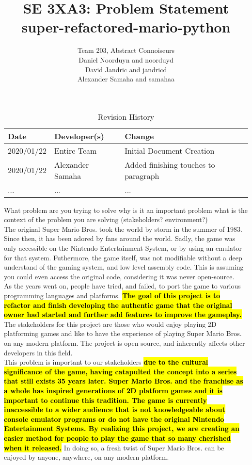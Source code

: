 \documentclass{article}
\title{SE 3XA3: Problem Statement\\super-refactored-mario-python}
\author{Team 203, Abstract Connoiseurs
		\\ Daniel Noorduyn and noorduyd
		\\ David Jandric and jandricd
		\\ Alexander Samaha and samahaa
}
\date{}
\begin{document}
\begin{table}[hp]
\caption{Revision History} \label{TblRevisionHistory}
\begin{tabularx}{\textwidth}{llX}
\toprule
\textbf{Date} & \textbf{Developer(s)} & \textbf{Change}\\
\midrule
2020/01/22 & Entire Team & Initial Document Creation\\
2020/01/22 & Alexander Samaha & Added finishing touches to paragraph\\
... & ... & ...\\
\bottomrule
\end{tabularx}
\end{table}

\newpage

\maketitle

What problem are you trying to solve
why is it an important problem
what is the context of the problem you are solving (stakeholders? environment?)\\

The original Super Mario Bros. took the world by storm in the summer of 1983. Since then, it has been adored by fans around the world. Sadly, the game was only accessible on the Nintendo Entertainment System, or by using an emulator for that system. Futhermore, the game itself, was not modifiable without a deep understand of the gaming system, and low level assembly code. This is assuming you could even access the original code, considering it was never open-source.\\

As the years went on, people have tried, and failed, to port the game to various programming languages and platforms. \textbf{{\hl{The goal of this project is to refactor and finish developing the authentic game that the original owner had started and further add features to improve the gameplay.}}} The stakeholders for this project are those who would enjoy playing 2D platforming games and like to have the experience of playing Super Mario Bros. on any modern platform. The project is open source, and inherently affects other developers in this field. \\ 

This problem is important to our stakeholders \textbf{{\hl{due to the cultural significance of the game, having catapulted the concept into a series that still exists 35 years later. Super Mario Bros. and the franchise as a whole has inspired generations of 2D platform games and it is important to continue this tradition. The game is currently inaccessible to a wider audience that is not knowledgeable about console emulator programs or do not have the original Nintendo Entertainment Systems. By realizing this project, we are creating an easier method for people to play the game that so many cherished when it released.}}} In doing so, a fresh twist of Super Mario Bros. can be enjoyed by anyone, anywhere, on any modern platform.





\end{document}
